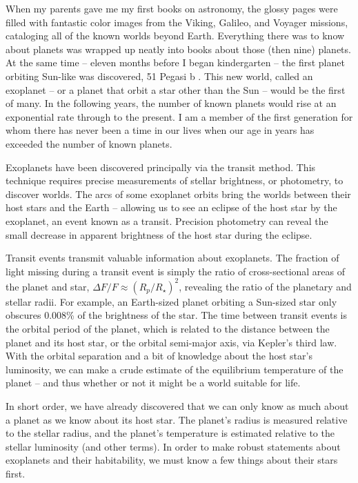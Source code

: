 
When my parents gave me my first books on astronomy, the glossy pages were filled with fantastic color images from the Viking, Galileo, and Voyager missions, cataloging all of the known worlds beyond Earth. Everything there was to know about planets was wrapped up neatly into books about those (then nine) planets. At the same time -- eleven months before I began kindergarten -- the first planet orbiting Sun-like was discovered, 51 Pegasi b \citep{Mayor1995}. This new world, called an exoplanet -- or a planet that orbit a star other than the Sun -- would be the first of many. In the following years, the number of known planets would rise at an exponential rate through to the present. I am a member of the first generation for whom there has never been a time in our lives when our age in years has exceeded the number of known planets.

Exoplanets have been discovered principally via the transit method. This technique requires precise measurements of stellar brightness, or photometry, to discover worlds. The arcs of some exoplanet orbits bring the worlds between their host stars and the Earth -- allowing us to see an eclipse of the host star by the exoplanet, an event known as a transit. Precision photometry can reveal the small decrease in apparent brightness of the host star during the eclipse. 

Transit events transmit valuable information about exoplanets. The fraction of light missing during a transit event is simply the ratio of cross-sectional areas of the planet and star, $\Delta F/F \approx (R_p/R_\star)^2$, revealing the ratio of the planetary and stellar radii. For example, an Earth-sized planet orbiting a Sun-sized star only obscures 0.008\% of the brightness of the star. The time between transit events is the orbital period of the planet, which is related to the distance between the planet and its host star, or the orbital semi-major axis, via Kepler's third law. With the orbital separation and a bit of knowledge about the host star's luminosity, we can make a crude estimate of the equilibrium temperature of the planet -- and thus whether or not it might be a world suitable for life.

In short order, we have already discovered that we can only know as much about a planet as we know about its host star. The planet's radius is measured relative to the stellar radius, and the planet's temperature is estimated relative to the stellar luminosity (and other terms). In order to make robust statements about exoplanets and their habitability, we must know a few things about their stars first.  

